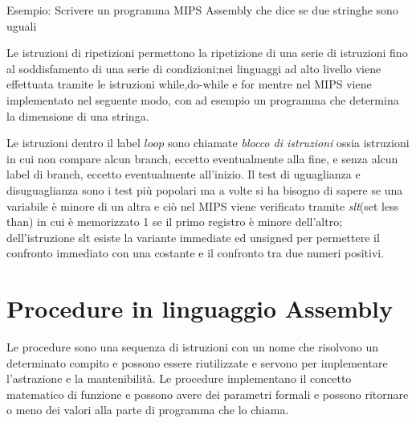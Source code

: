 Esempio: Scrivere un programma MIPS Assembly che dice se due stringhe sono uguali


Le istruzioni di ripetizioni permettono la ripetizione di una serie di istruzioni
fino al soddisfamento di una serie di condizioni;nei linguaggi ad alto livello viene
effettuata tramite le istruzioni while,do-while e for mentre nel MIPS viene implementato
nel seguente modo, con ad esempio un programma che determina la dimensione di una stringa.


Le istruzioni dentro il label $loop$ sono chiamate \emph{blocco di istruzioni} ossia
istruzioni in cui non compare alcun branch, eccetto eventualmente alla fine, e
senza alcun label di branch, eccetto eventualmente all'inizio.
Il test di uguaglianza e disuguaglianza sono i test più popolari ma a volte si ha
bisogno di sapere se una variabile è minore di un altra e ciò nel MIPS viene verificato
tramite \emph{slt}(set less than) in cui è memorizzato 1 se il primo registro è minore
dell'altro; dell'istruzione slt esiste la variante immediate ed unsigned per permettere
il confronto immediato con una costante e il confronto tra due numeri positivi.

\section{Procedure in linguaggio Assembly}
Le procedure sono una sequenza di istruzioni con un nome che risolvono un determinato compito
e possono essere riutilizzate e servono per implementare l'astrazione e la mantenibilità.
Le procedure implementano il concetto matematico di funzione e possono avere dei parametri
formali e possono ritornare o meno dei valori alla parte di programma che lo chiama.

